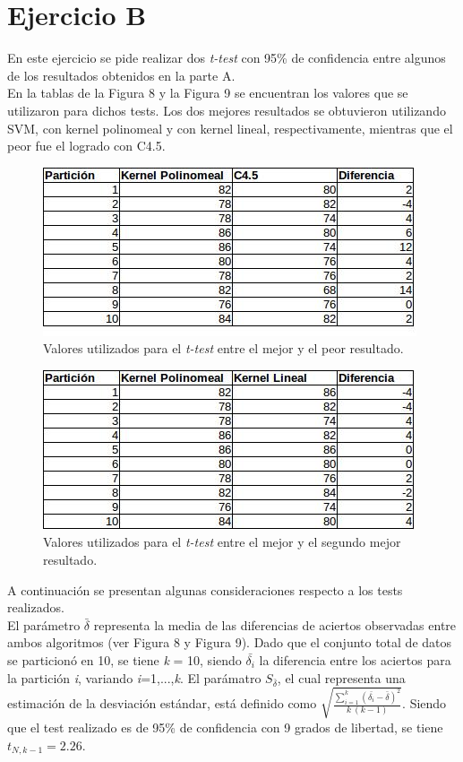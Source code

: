 \documentclass[12pt, a4paper]{article}
\begin{document}
\section*{Ejercicio B}

En este ejercicio se pide realizar dos \textit{t-test} con 95\% de confidencia entre algunos de los resultados obtenidos en la parte A.\\
En la tablas de la Figura 8 y la Figura 9 se encuentran los valores que se utilizaron para dichos tests. Los dos mejores resultados se obtuvieron utilizando SVM, con kernel polinomeal y con kernel lineal, respectivamente, mientras que el peor fue el logrado con C4.5.

 \begin{figure}
    \centering
	\includegraphics[scale=0.8]{tabla7}
	\caption{Valores utilizados para el \textit{t-test} entre el mejor y el peor resultado.}
\end{figure}
 \begin{figure}
    \centering
	\includegraphics[scale=0.8]{tabla8}
	\caption{Valores utilizados para el \textit{t-test} entre el mejor y el segundo mejor resultado.}
\end{figure}


\bigskip

A continuación se presentan algunas consideraciones respecto a los tests realizados. \\
El parámetro $\bar{\delta}$ representa la media de las diferencias de aciertos observadas entre ambos algoritmos  (ver Figura 8 y Figura 9). Dado que el conjunto total de datos se particionó en 10, se tiene \textit{k} = 10,  siendo $\bar{\delta_i}$ la diferencia entre los aciertos para la partición \textit{i}, variando \textit{i}=1,...,\textit{k}. El parámatro $S_{\bar{\delta}}$, el cual representa una estimación de la desviación estándar, está definido como  $\sqrt{\frac {\sum_{i=1}^k (\bar{\delta_i} - \bar{\delta})^2}{k \ (k-1)}} $. Siendo que el test realizado es de 95\% de confidencia con 9 grados de libertad, se tiene $t_{N,k-1}  = 2.26 $.
\end{document}
